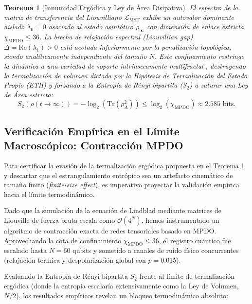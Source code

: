\documentclass[12pt,a4paper]{article}
\theoremstyle{plain}
\newtheorem{teorema}{Teorema}[section]
\theoremstyle{definition}
\theoremstyle{remark}
\begin{document}
\begin{teorema}[Inmunidad Ergódica y Ley de Área Disipativa]
\label{teo:parent_lindbladian}
El espectro de la matriz de transferencia del Liouvilliano $\mathcal{L}_{\text{MST}}$ exhibe un autovalor dominante aislado $\lambda_0 = 0$ asociado al estado asintótico $\rho_\infty$ con dimensión de enlace estricta $\chi_{\text{MPDO}} \le 36$. La brecha de relajación espectral (\textit{Liouvillian gap}) $\Delta = \text{Re}(\lambda_1) > 0$ está acotada inferiormente por la penalización topológica, siendo analíticamente independiente del tamaño $N$. Este confinamiento restringe la dinámica a una variedad de soporte intrínsecamente multifractal \cite{PeinadorRiemann}, destruyendo la termalización de volumen dictada por la Hipótesis de Termalización del Estado Propio (ETH) y forzando a la Entropía de Rényi bipartita ($S_2$) a saturar una Ley de Área estricta:
\begin{equation}
S_2(\rho(t \to \infty)) = -\log_2(\text{Tr}(\rho_A^2)) \le \log_2(\chi_{\text{MPDO}}) \approx 2.585 \text{ bits}.
\end{equation}
\end{teorema}

\subsection{Verificación Empírica en el Límite Macroscópico: Contracción MPDO}
\label{subsec:verificacion_empirica}

Para certificar la evasión de la termalización ergódica propuesta en el Teorema \ref{teo:parent_lindbladian} y descartar que el estrangulamiento entrópico sea un artefacto cinemático de tamaño finito (\textit{finite-size effect}), es imperativo proyectar la validación empírica hacia el límite termodinámico. 

Dado que la simulación de la ecuación de Lindblad mediante matrices de Liouville de fuerza bruta escala como $\mathcal{O}(4^N)$, hemos instrumentado un algoritmo de contracción exacta de redes tensoriales basado en MPDO. Aprovechando la cota de confinamiento $\chi_{\text{MPDO}} \le 36$, el registro cuántico fue escalado hasta $N=60$ qubits y sometido a canales de ruido físico concurrentes (relajación térmica y despolarización global con $p=0.015$).

Evaluando la Entropía de Rényi bipartita $S_2$ frente al límite de termalización ergódica (donde la entropía escalaría extensivamente como la Ley de Volumen, $N/2$), los resultados empíricos revelan un bloqueo termodinámico absoluto:
\end{document}
